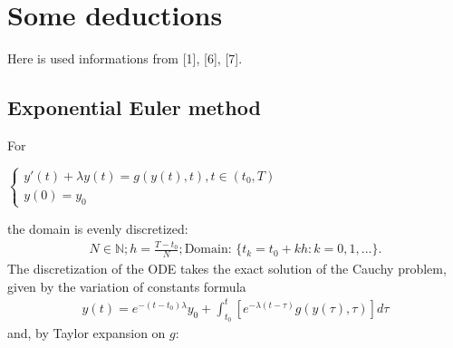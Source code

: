 \documentclass[letterpaper,10pt,english]{jupyterBook}
\begin{document}
\section{Some deductions}
\label{\detokenize{appendix:some-deductions}}
\sphinxAtStartPar
Here is used informations from {[}1{]}, {[}6{]}, {[}7{]}.


\subsection{Exponential Euler method}
\label{\detokenize{appendix:exponential-euler-method}}
\sphinxAtStartPar
For

\sphinxAtStartPar
\(\begin{cases}
    y'(t) + \lambda y(t) = g(y(t), t), t \in (t_0, T) \\
    y(0) = y_0
\end{cases}\)

\sphinxAtStartPar
the domain is evenly discretized:
\begin{equation*}
\begin{split}
    N \in \mathbb{N}; h = \frac{T-t_0}{N}; \text{Domain: }\{t_k = t_0 + k h : k = 0, 1, ...\}.
\end{split}
\end{equation*}
\sphinxAtStartPar
The discretization of the ODE takes the exact solution of the Cauchy problem, given by the variation of constants formula
\begin{equation*}
\begin{split}
    y(t) = e^{-(t-t_0) \lambda}y_0 + \int_{t_0}^t [e^{-\lambda(t-\tau)} g(y(\tau), \tau)] d\tau
\end{split}
\end{equation*}
\sphinxAtStartPar
and, by Taylor expansion on \(g\):
\end{document}
